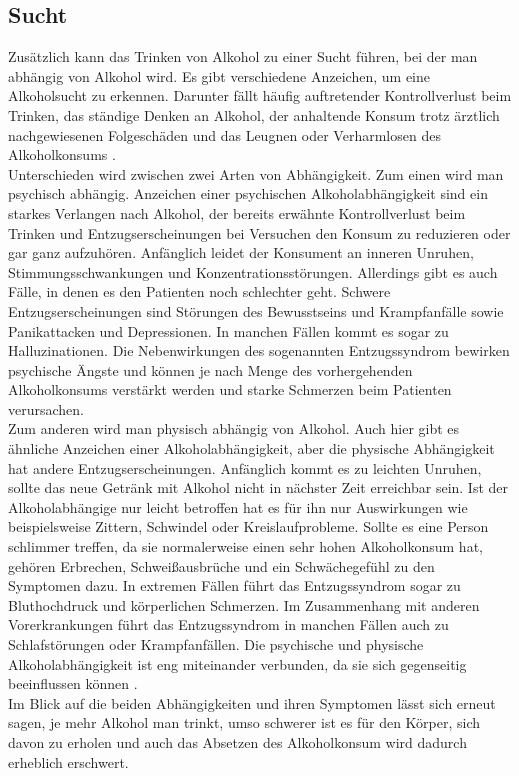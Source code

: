 \documentclass[12pt]{article}
\begin{document}
\subsection{Sucht}                                                                                                                
Zusätzlich kann das Trinken von Alkohol zu einer Sucht führen, bei der man abhängig von Alkohol wird. Es gibt verschiedene Anzeichen, um eine Alkoholsucht zu erkennen. Darunter fällt häufig auftretender Kontrollverlust beim Trinken, das ständige Denken an Alkohol, der anhaltende Konsum trotz ärztlich nachgewiesenen Folgeschäden und das Leugnen oder Verharmlosen des Alkoholkonsums \autocite{burger_bundes-gesundheitssurvey_2003}. \\
Unterschieden wird zwischen zwei Arten von Abhängigkeit. Zum einen wird man psychisch abhängig. Anzeichen einer psychischen Alkoholabhängigkeit sind ein starkes Verlangen nach Alkohol, der bereits erwähnte Kontrollverlust beim Trinken und Entzugserscheinungen bei Versuchen den Konsum zu reduzieren oder gar ganz aufzuhören. Anfänglich leidet der Konsument an inneren Unruhen, Stimmungsschwankungen und Konzentrationsstörungen. Allerdings gibt es auch Fälle, in denen es den Patienten noch schlechter geht. Schwere Entzugserscheinungen sind Störungen des Bewusstseins und Krampfanfälle sowie Panikattacken und Depressionen. In manchen Fällen kommt es sogar zu Halluzinationen. Die Nebenwirkungen des sogenannten Entzugssyndrom bewirken psychische Ängste und können je nach Menge des vorhergehenden Alkoholkonsums verstärkt werden und starke Schmerzen beim Patienten verursachen.\\
Zum anderen wird man physisch abhängig von Alkohol. Auch hier gibt es ähnliche Anzeichen einer Alkoholabhängigkeit, aber die physische Abhängigkeit hat andere Entzugserscheinungen. Anfänglich kommt es zu leichten Unruhen, sollte das neue Getränk mit Alkohol nicht in nächster Zeit erreichbar sein. Ist der Alkoholabhängige nur leicht betroffen hat es für ihn nur Auswirkungen wie beispielsweise Zittern, Schwindel oder Kreislaufprobleme. Sollte es eine Person schlimmer treffen, da sie normalerweise einen sehr hohen Alkoholkonsum hat, gehören Erbrechen, Schweißausbrüche und ein Schwächegefühl zu den Symptomen dazu. In extremen Fällen führt das Entzugssyndrom sogar zu Bluthochdruck und körperlichen Schmerzen. Im Zusammenhang mit anderen Vorerkrankungen führt das Entzugssyndrom in manchen Fällen auch zu Schlafstörungen oder Krampfanfällen. Die psychische und physische Alkoholabhängigkeit ist eng miteinander verbunden, da sie sich gegenseitig beeinflussen können \autocite{gohring_entzugserscheinungen_2022}. \\
Im Blick auf die beiden Abhängigkeiten und ihren Symptomen lässt sich erneut sagen, je mehr Alkohol man trinkt, umso schwerer ist es für den Körper, sich davon zu erholen und auch das Absetzen des Alkoholkonsum wird dadurch erheblich erschwert. \\
\end{document}
